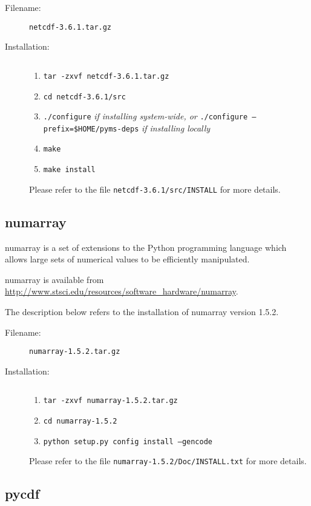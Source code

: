 \begin{description}
\item [Filename:] {\tt netcdf-3.6.1.tar.gz}
\item [Installation:] $ $
  \begin{enumerate}
  \item {\tt tar -zxvf netcdf-3.6.1.tar.gz}
  \item {\tt cd netcdf-3.6.1/src}
  \item {\tt ./configure} {\it if installing system-wide, or}\newline
        {\tt ./configure --prefix=\$HOME/pyms-deps} {\it if installing locally}
  \item {\tt make}
  \item {\tt make install}
  \end{enumerate}
Please refer to the file {\tt netcdf-3.6.1/src/INSTALL} for more details.
\end{description}

\subsection{numarray}

numarray is a set of extensions to the Python programming language which
allows large sets of numerical values to be efficiently manipulated.

numarray is available from \url{http://www.stsci.edu/resources/software_hardware/numarray}.

The description below refers to the installation of numarray version
1.5.2.

\begin{description}
\item [Filename:] {\tt numarray-1.5.2.tar.gz}
\item [Installation:] $ $
  \begin{enumerate}
  \item {\tt tar -zxvf numarray-1.5.2.tar.gz}
  \item {\tt cd numarray-1.5.2}
  \item {\tt python setup.py config install --gencode}
  \end{enumerate}
Please refer to the file {\tt numarray-1.5.2/Doc/INSTALL.txt} for more
details.
\end{description}

\subsection{pycdf}

